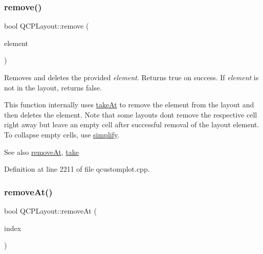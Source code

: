 \mbox{\label{class_q_c_p_layout_a6c58f537d8086f352576ab7c5b15d0bc}} 
\subsubsection{\texorpdfstring{remove()}{remove()}}
{\footnotesize\ttfamily bool Q\+C\+P\+Layout\+::remove (\begin{DoxyParamCaption}\item[{\hyperlink{class_q_c_p_layout_element}{Q\+C\+P\+Layout\+Element} $\ast$}]{element }\end{DoxyParamCaption})}

Removes and deletes the provided {\itshape element}. Returns true on success. If {\itshape element} is not in the layout, returns false.

This function internally uses \hyperlink{class_q_c_p_layout_a5a79621fa0a6eabb8b520cfc04fb601a}{take\+At} to remove the element from the layout and then deletes the element. Note that some layouts don\textquotesingle{}t remove the respective cell right away but leave an empty cell after successful removal of the layout element. To collapse empty cells, use \hyperlink{class_q_c_p_layout_a41e6ac049143866e8f8b4964efab01b2}{simplify}.

\begin{DoxySeeAlso}{See also}
\hyperlink{class_q_c_p_layout_a2403f684fee3ce47132faaeed00bb066}{remove\+At}, \hyperlink{class_q_c_p_layout_ada26cd17e56472b0b4d7fbbc96873e4c}{take} 
\end{DoxySeeAlso}


Definition at line 2211 of file qcustomplot.\+cpp.

\mbox{\label{class_q_c_p_layout_a2403f684fee3ce47132faaeed00bb066}} 
\subsubsection{\texorpdfstring{remove\+At()}{removeAt()}}
{\footnotesize\ttfamily bool Q\+C\+P\+Layout\+::remove\+At (\begin{DoxyParamCaption}\item[{int}]{index }\end{DoxyParamCaption})}

